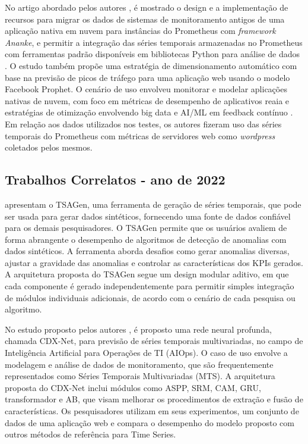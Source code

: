 No artigo abordado pelos autores \cite{9680514}, é mostrado o design e a implementação de recursos para migrar os dados de sistemas de monitoramento antigos de uma aplicação nativa em nuvem para instâncias do Prometheus com \textit{framework Ananke}, e permitir a integração das séries temporais armazenadas no Prometheus com ferramentas padrão disponíveis em bibliotecas Python para análise de dados . O estudo também propõe uma estratégia de dimensionamento automático com base na previsão de picos de tráfego para uma aplicação web usando o modelo Facebook Prophet. O cenário de uso envolveu monitorar e modelar aplicações nativas de nuvem, com foco em métricas de desempenho de aplicativos reaia e estratégias de otimização envolvendo big data e AI/ML em  feedback contínuo . Em relação aos dados utilizados nos testes, os autores fizeram uso das séries temporais do Prometheus com métricas de servidores web como \textit{wordpress} coletados pelos mesmos.


\subsection{Trabalhos Correlatos - ano de 2022}\label{trab_correlatos_22}

\cite{9492267} apresentam o TSAGen, uma ferramenta de geração de séries temporais, que pode ser usada para gerar dados sintéticos, fornecendo uma fonte de dados confiável para os demais pesquisadores. O TSAGen permite que os usuários avaliem de forma abrangente o desempenho de algoritmos de detecção de anomalias com dados sintéticos. A ferramenta aborda desafios como gerar anomalias diversas, ajustar a gravidade das anomalias e controlar as características dos KPIs gerados. A arquitetura proposta do TSAGen segue um design modular aditivo, em que cada componente é gerado independentemente para permitir simples integração de módulos individuais adicionais, de acordo com o cenário de cada pesquisa ou algoritmo.

No estudo proposto pelos autores \cite{9746242}, é proposto uma rede neural profunda, chamada CDX-Net, para previsão de séries temporais multivariadas, no campo de Inteligência Artificial para Operações de TI (AIOps). O caso de uso envolve a modelagem e análise de dados de monitoramento, que são frequentemente representados como Séries Temporais Multivariadas (MTS). A arquitetura proposta do CDX-Net inclui módulos como ASPP, SRM, CAM, GRU, transformador e AB, que visam melhorar os procedimentos de extração e fusão de características. Os pesquisadores utilizam em seus experimentos, um conjunto de dados de uma aplicação web e compara o desempenho do modelo proposto com outros métodos de referência para Time Series.


